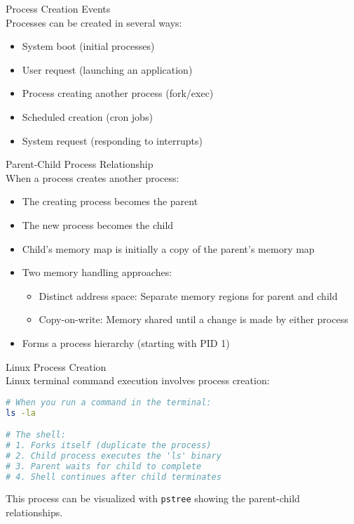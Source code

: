 \begin{definition}{Process Creation Events}\\
    Processes can be created in several ways:
    \begin{itemize}
        \item System boot (initial processes)
        \item User request (launching an application)
        \item Process creating another process (fork/exec)
        \item Scheduled creation (cron jobs)
        \item System request (responding to interrupts)
    \end{itemize}
\end{definition}

\begin{definition}{Parent-Child Process Relationship}\\
    When a process creates another process:
    \begin{itemize}
        \item The creating process becomes the parent
        \item The new process becomes the child
        \item Child's memory map is initially a copy of the parent's memory map
        \item Two memory handling approaches:
            \begin{itemize}
                \item Distinct address space: Separate memory regions for parent and child
                \item Copy-on-write: Memory shared until a change is made by either process
            \end{itemize}
        \item Forms a process hierarchy (starting with PID 1)
    \end{itemize}
\end{definition}

\begin{example2}{Linux Process Creation}\\
    Linux terminal command execution involves process creation:
\begin{lstlisting}[language=bash, style=basesmol]
# When you run a command in the terminal:
ls -la

# The shell:
# 1. Forks itself (duplicate the process)
# 2. Child process executes the 'ls' binary
# 3. Parent waits for child to complete
# 4. Shell continues after child terminates
\end{lstlisting}

    This process can be visualized with \texttt{pstree} showing the parent-child relationships.
\end{example2}

